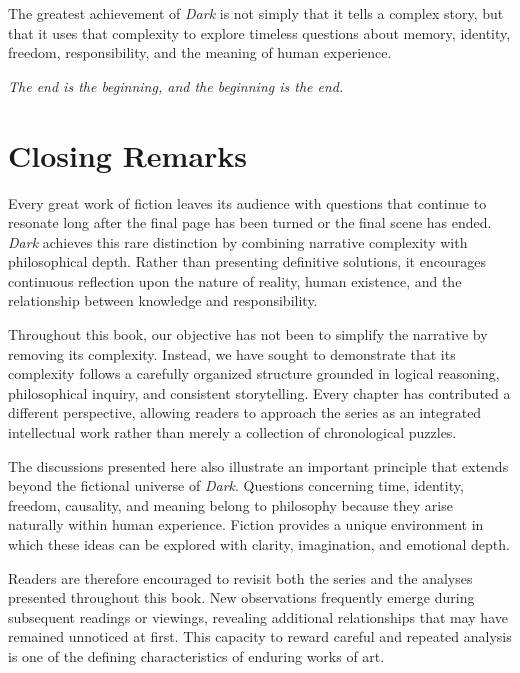 \documentclass[12pt,oneside,openany]{book}
\begin{document}
\begin{tcolorbox}[colback=orange!8,colframe=orange!70!black,title=Closing Thought]
The greatest achievement of \textit{Dark} is not simply that it tells a
complex story, but that it uses that complexity to explore timeless questions
about memory, identity, freedom, responsibility, and the meaning of human
experience.
\end{tcolorbox}

\begin{center}
\Large\textit{The end is the beginning, and the beginning is the end.}
\end{center}
\section{Closing Remarks}

Every great work of fiction leaves its audience with questions that continue to
resonate long after the final page has been turned or the final scene has
ended. \textit{Dark} achieves this rare distinction by combining narrative
complexity with philosophical depth. Rather than presenting definitive
solutions, it encourages continuous reflection upon the nature of reality,
human existence, and the relationship between knowledge and responsibility.

Throughout this book, our objective has not been to simplify the narrative by
removing its complexity. Instead, we have sought to demonstrate that its
complexity follows a carefully organized structure grounded in logical
reasoning, philosophical inquiry, and consistent storytelling. Every chapter
has contributed a different perspective, allowing readers to approach the
series as an integrated intellectual work rather than merely a collection of
chronological puzzles.

The discussions presented here also illustrate an important principle that
extends beyond the fictional universe of \textit{Dark}. Questions concerning
time, identity, freedom, causality, and meaning belong to philosophy because
they arise naturally within human experience. Fiction provides a unique
environment in which these ideas can be explored with clarity, imagination, and
emotional depth.

Readers are therefore encouraged to revisit both the series and the analyses
presented throughout this book. New observations frequently emerge during
subsequent readings or viewings, revealing additional relationships that may
have remained unnoticed at first. This capacity to reward careful and repeated
analysis is one of the defining characteristics of enduring works of art.
\end{document}
